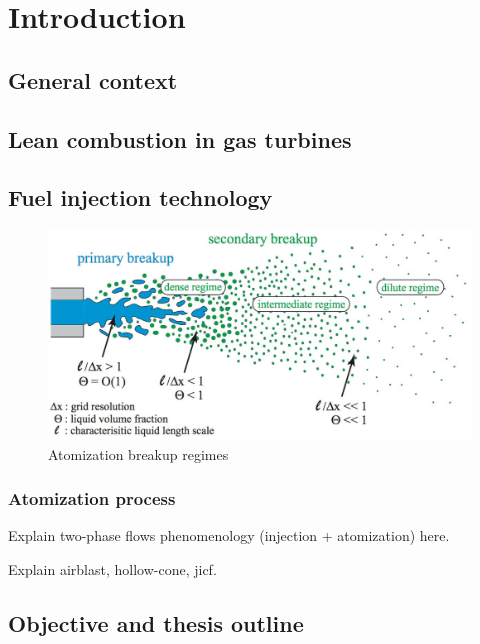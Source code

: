 \chapter{Introduction}
    

\section{General context}


\section{Lean combustion in gas turbines}


\section{Fuel injection technology}

\begin{figure}[h!]
	\centering
	\includegraphics[scale=0.5]{./part0_intro/figures_intro/atomization-regimes-scheme}
	\caption{Atomization breakup regimes }
	\label{fig:atomization_regimes_herrmann}
\end{figure}

\subsection*{Atomization process}

Explain two-phase flows phenomenology (injection + atomization) here. 

Explain airblast, hollow-cone, jicf.

\section{Objective and thesis outline}

